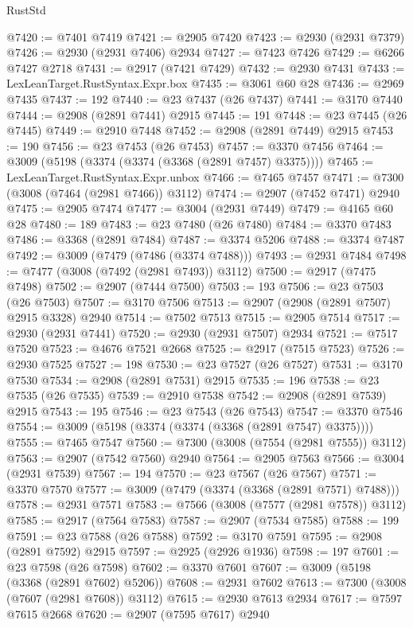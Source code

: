 \begin{lexlean}{RustStd}
\begin{coremodule}
@7420 := @7401 @7419
@7421 := @2905 @7420
@7423 := @2930 (@2931 @7379)
@7426 := @2930 (@2931 @7406) @2934
@7427 := @7423 @7426
@7429 := @6266 @7427 @2718
@7431 := @2917 (@7421 @7429)
@7432 := @2930 @7431
@7433 := LexLeanTarget.RustSyntax.Expr.box
@7435 := @3061 @60 @28
@7436 := @2969 @7435
@7437 := 192
@7440 := @23 @7437 (@26 @7437)
@7441 := @3170 @7440
@7444 := @2908 (@2891 @7441) @2915
@7445 := 191
@7448 := @23 @7445 (@26 @7445)
@7449 := @2910 @7448
@7452 := @2908 (@2891 @7449) @2915
@7453 := 190
@7456 := @23 @7453 (@26 @7453)
@7457 := @3370 @7456
@7464 := @3009 (@5198 (@3374 (@3374 (@3368 (@2891 @7457) @3375))))
@7465 := LexLeanTarget.RustSyntax.Expr.unbox
@7466 := @7465 @7457
@7471 := @7300 (@3008 (@7464 (@2981 @7466)) @3112)
@7474 := @2907 (@7452 @7471) @2940
@7475 := @2905 @7474
@7477 := @3004 (@2931 @7449)
@7479 := @4165 @60 @28
@7480 := 189
@7483 := @23 @7480 (@26 @7480)
@7484 := @3370 @7483
@7486 := @3368 (@2891 @7484)
@7487 := @3374 @5206
@7488 := @3374 @7487
@7492 := @3009 (@7479 (@7486 (@3374 @7488)))
@7493 := @2931 @7484
@7498 := @7477 (@3008 (@7492 (@2981 @7493)) @3112)
@7500 := @2917 (@7475 @7498)
@7502 := @2907 (@7444 @7500)
@7503 := 193
@7506 := @23 @7503 (@26 @7503)
@7507 := @3170 @7506
@7513 := @2907 (@2908 (@2891 @7507) @2915 @3328) @2940
@7514 := @7502 @7513
@7515 := @2905 @7514
@7517 := @2930 (@2931 @7441)
@7520 := @2930 (@2931 @7507) @2934
@7521 := @7517 @7520
@7523 := @4676 @7521 @2668
@7525 := @2917 (@7515 @7523)
@7526 := @2930 @7525
@7527 := 198
@7530 := @23 @7527 (@26 @7527)
@7531 := @3170 @7530
@7534 := @2908 (@2891 @7531) @2915
@7535 := 196
@7538 := @23 @7535 (@26 @7535)
@7539 := @2910 @7538
@7542 := @2908 (@2891 @7539) @2915
@7543 := 195
@7546 := @23 @7543 (@26 @7543)
@7547 := @3370 @7546
@7554 := @3009 (@5198 (@3374 (@3374 (@3368 (@2891 @7547) @3375))))
@7555 := @7465 @7547
@7560 := @7300 (@3008 (@7554 (@2981 @7555)) @3112)
@7563 := @2907 (@7542 @7560) @2940
@7564 := @2905 @7563
@7566 := @3004 (@2931 @7539)
@7567 := 194
@7570 := @23 @7567 (@26 @7567)
@7571 := @3370 @7570
@7577 := @3009 (@7479 (@3374 (@3368 (@2891 @7571) @7488)))
@7578 := @2931 @7571
@7583 := @7566 (@3008 (@7577 (@2981 @7578)) @3112)
@7585 := @2917 (@7564 @7583)
@7587 := @2907 (@7534 @7585)
@7588 := 199
@7591 := @23 @7588 (@26 @7588)
@7592 := @3170 @7591
@7595 := @2908 (@2891 @7592) @2915
@7597 := @2925 (@2926 @1936)
@7598 := 197
@7601 := @23 @7598 (@26 @7598)
@7602 := @3370 @7601
@7607 := @3009 (@5198 (@3368 (@2891 @7602) @5206))
@7608 := @2931 @7602
@7613 := @7300 (@3008 (@7607 (@2981 @7608)) @3112)
@7615 := @2930 @7613 @2934
@7617 := @7597 @7615 @2668
@7620 := @2907 (@7595 @7617) @2940

\end{coremodule}
\end{lexlean}
